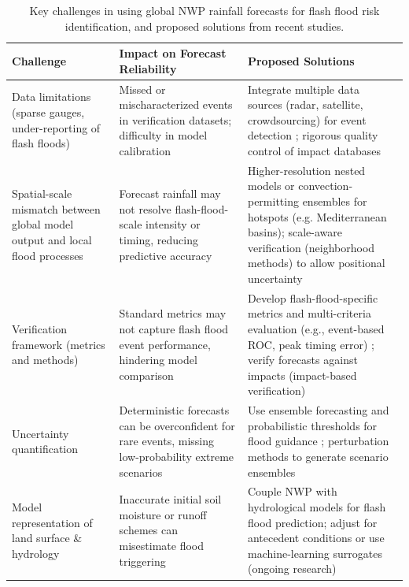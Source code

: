 \begin{table}[hbt]\centering
\caption{Key challenges in using global NWP rainfall forecasts for flash flood risk identification, and proposed solutions from recent studies.\label{tab:ff_challenges}}
\begin{tabular}{p{4.5cm} p{6.2cm} p{5.5cm}}
\hline
\textbf{Challenge} & \textbf{Impact on Forecast Reliability} & \textbf{Proposed Solutions} \\
\hline
Data limitations (sparse gauges, under-reporting of flash floods) & Missed or mischaracterized events in verification datasets; difficulty in model calibration & Integrate multiple data sources (radar, satellite, crowdsourcing) for event detection \citep{Pham2020}; rigorous quality control of impact databases \\
Spatial-scale mismatch between global model output and local flood processes & Forecast rainfall may not resolve flash-flood-scale intensity or timing, reducing predictive accuracy & Higher-resolution nested models or convection-permitting ensembles for hotspots \citep{Vincendon2011} (e.g. Mediterranean basins); scale-aware verification (neighborhood methods) to allow positional uncertainty \citep{CharpentierNoyer2023} \\
Verification framework (metrics and methods) & Standard metrics may not capture flash flood event performance, hindering model comparison & Develop flash-flood-specific metrics and multi-criteria evaluation (e.g., event-based ROC, peak timing error) \citep{CharpentierNoyer2023,Viterbo2020}; verify forecasts against impacts (impact-based verification) \citep{Herman2018} \\
Uncertainty quantification & Deterministic forecasts can be overconfident for rare events, missing low-probability extreme scenarios & Use ensemble forecasting and probabilistic thresholds for flood guidance \citep{Ntelekos2006}; perturbation methods to generate scenario ensembles \citep{Vincendon2011} \\
Model representation of land surface \& hydrology & Inaccurate initial soil moisture or runoff schemes can misestimate flood triggering & Couple NWP with hydrological models for flash flood prediction; adjust for antecedent conditions or use machine-learning surrogates (ongoing research) \\
\hline
\end{tabular}
\end{table}

